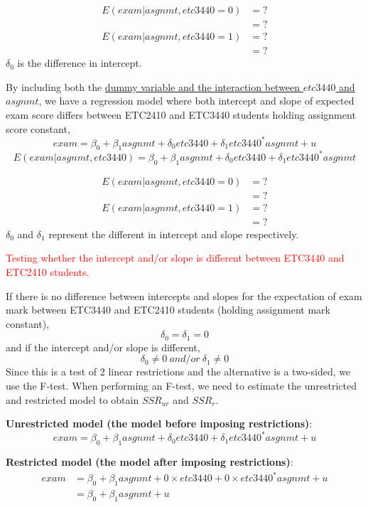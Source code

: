 \documentclass[12pt]{report}
\begin{document}
\begin{align*}
	E(exam|asgnmt,etc3440=0) &= ? \\
	& = ?
\end{align*}
\begin{align*}
	E(exam|asgnmt,etc3440=1) &= ? \\
	& = ?
\end{align*}
\noindent $\delta_0$ is the difference in intercept.

\noindent By including both the \uline{dummy variable and the interaction between $etc3440$ and $asgnmt$}, we have a regression model where both intercept and slope of expected exam score differs between ETC2410 and ETC3440 students holding assignment score constant,
$$exam = \beta_0 + \beta_1asgnmt + \delta_0etc3440 + \delta_1etc3440^*asgnmt + u$$
$$E(exam|asgnmt,etc3440) = \beta_0 + \beta_1asgnmt + \delta_0etc3440 + \delta_1etc3440^*asgnmt $$

\begin{align*}
E(exam|asgnmt,etc3440=0) &= ? \\
& = ?
\end{align*}
\begin{align*}
E(exam|asgnmt,etc3440=1) &= ? \\
& = ?
\end{align*}
\noindent $\delta_0$ and $\delta_1$ represent the different in intercept and slope respectively.

\newpage
\noindent \textcolor{red}
{
	Testing whether the intercept and/or slope is different between ETC3440 and ETC2410 students.
}

\noindent If there is no difference between intercepts and slopes for the expectation of exam mark between ETC3440 and ETC2410 students (holding assignment mark constant),
$$\delta_0 = \delta_1 = 0$$
\noindent and if the intercept and/or slope is different,
$$\delta_0 \neq 0\ and/or\ \delta_1 \neq 0$$
\noindent Since this is a test of 2 linear restrictions and the alternative is a two-sided, we use the F-test. When performing an F-test, we need to estimate the unrestricted and restricted model to obtain $SSR_{ur}$ and $SSR_r$.

\noindent \noindent \textbf{Unrestricted model (the model before imposing restrictions)}:
$$exam = \beta_0 + \beta_1asgnmt + \delta_0etc3440 + \delta_1etc3440^*asgnmt + u$$

\noindent \textbf{Restricted model (the model after imposing restrictions)}:
\begin{align*}
	exam &= \beta_0 + \beta_1asgnmt + 0\times etc3440 + 0\times etc3440^*asgnmt + u \\
	&= \beta_0 + \beta_1asgnmt + u
\end{align*}
\end{document}
